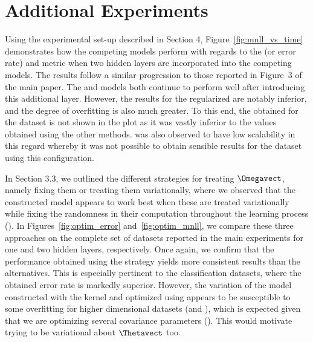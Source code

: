 \appendix 
\onecolumn

\section{Additional Experiments}

Using the experimental set-up described in Section 4, Figure~\ref{fig:mnll_vs_time} demonstrates how the competing models perform with regards to the \rmse (or error rate) and \mnll metric when two hidden layers are incorporated into the competing models.
The results follow a similar progression to those reported in Figure~3 of the main paper.
The \dgparc and \dgprbf models both continue to perform well after introducing this additional layer.
However, the results for the regularized \dnn are notably inferior, and the degree of overfitting is also much greater.
To this end, the \mnll obtained for the \mnist dataset is not shown in the plot as it was vastly inferior to the values obtained using the other methods.
\dgpep was also observed to have low scalability in this regard whereby it was not possible to obtain sensible results for the \mnist dataset using this configuration.
 


In Section 3.3, we outlined the different strategies for treating $\Omegavect$, namely fixing them or treating them variationally, where we observed that the constructed \dgp model appears to work best when these are treated variationally while fixing the randomness in their computation throughout the learning process ().
In Figures~\ref{fig:optim_error} and~\ref{fig:optim_mnll}, we compare these three approaches on the complete set of datasets reported in the main experiments for one and two hidden layers, respectively.
Once again, we confirm that the performance obtained using the  strategy yields more consistent results than the alternatives.
This is especially pertinent to the classification datasets, where the obtained error rate is markedly superior.
However, the variation of the model constructed with the \arccosine kernel and optimized using  appears to be susceptible to some overfitting for higher dimensional datasets (\spam and \mnist), which is expected given that we are optimizing several covariance parameters (\ard).
This would motivate trying to be variational about $\Thetavect$ too. 

